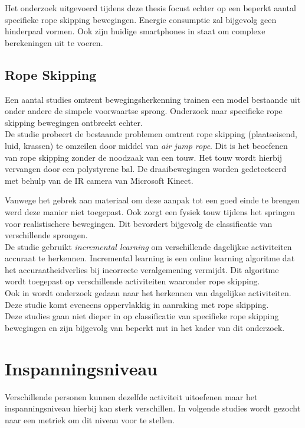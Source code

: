 Het onderzoek uitgevoerd tijdens deze thesis focust echter op een beperkt aantal specifieke rope skipping bewegingen. Energie consumptie zal bijgevolg geen hinderpaal vormen. Ook zijn huidige smartphones in staat om complexe berekeningen uit te voeren.

\subsection{Rope Skipping}
Een aantal studies omtrent bewegingsherkenning trainen een model bestaande uit onder andere de simpele voorwaartse sprong. Onderzoek naar specifieke rope skipping bewegingen ontbreekt echter. \\

De studie \cite{ref51} probeert de bestaande problemen omtrent rope skipping (plaatseisend, luid, krassen) te omzeilen door middel van \textit{air jump rope}. Dit is het beoefenen van rope skipping zonder de noodzaak van een touw. Het touw wordt hierbij vervangen door een polystyrene bal. De draaibewegingen worden gedetecteerd met behulp van de IR camera van Microsoft Kinect.

Vanwege het gebrek aan materiaal om deze aanpak tot een goed einde te brengen werd deze manier niet toegepast. Ook zorgt een fysiek touw tijdens het springen voor realistischere bewegingen. Dit bevordert bijgevolg de classificatie van verschillende sprongen.
\\

De studie \cite{ref52} gebruikt \textit{incremental learning} om verschillende dagelijkse activiteiten accuraat te herkennen. Incremental learning is een online learning algoritme dat het accuraatheidverlies bij incorrecte veralgemening vermijdt. Dit algoritme wordt toegepast op verschillende activiteiten waaronder rope skipping. \\

Ook in \cite{ref53} wordt onderzoek gedaan naar het herkennen van dagelijkse activiteiten. Deze studie komt eveneens oppervlakkig in aanraking met rope skipping. \\

Deze studies gaan niet dieper in op classificatie van specifieke rope skipping bewegingen en zijn bijgevolg van beperkt nut in het kader van dit onderzoek.
\\

\section{Inspanningsniveau}
Verschillende personen kunnen dezelfde activiteit uitoefenen maar het inspanningsniveau hierbij kan sterk verschillen. In volgende studies wordt gezocht naar een metriek om dit niveau voor te stellen.\\

